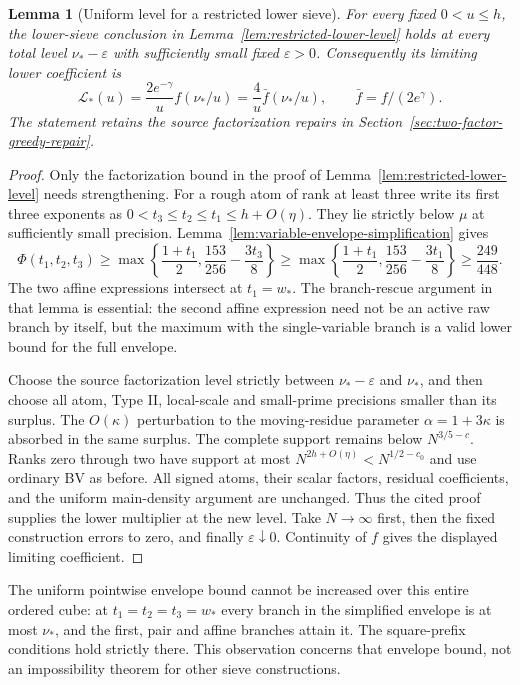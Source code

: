 \documentclass[11pt]{article}
\newtheorem{lemma}[theorem]{Lemma}
\begin{document}
\begin{lemma}[Uniform level for a restricted lower sieve]
\label{lem:restricted-lower-sharp-level}
For every fixed $0<u\le h$, the lower-sieve conclusion in
Lemma~\ref{lem:restricted-lower-level} holds at every total
level $\nu_* -\varepsilon$ with sufficiently small fixed $\varepsilon>0$.
Consequently its limiting lower coefficient is
\[
 \mathcal L_*(u)=\frac{2e^{-\gamma}}u f(\nu_*/u)
               =\frac4u\bar f(\nu_*/u),
 \qquad \bar f=f/(2e^\gamma).
\]
The statement retains the source factorization repairs in
Section~\ref{sec:two-factor-greedy-repair}.
\end{lemma}

\begin{proof}
Only the factorization bound in the proof of
Lemma~\ref{lem:restricted-lower-level} needs strengthening.
For a rough atom of rank at least three write its first
three exponents as $0<t_3\le t_2\le t_1\le h+O(\eta)$.
They lie strictly below $\mu$ at sufficiently small precision.
Lemma~\ref{lem:variable-envelope-simplification} gives
\[
 \Phi(t_1,t_2,t_3)
 \ge\max\left\{\frac{1+t_1}{2},
                      \frac{153}{256}-\frac{3t_3}{8}\right\}
 \ge\max\left\{\frac{1+t_1}{2},
                      \frac{153}{256}-\frac{3t_1}{8}\right\}
 \ge\frac{249}{448}.
\]
The two affine expressions intersect at $t_1=w_*$.
The branch-rescue argument in that lemma is essential: the
second affine expression need not be an active raw branch
by itself, but the maximum with the single-variable branch
is a valid lower bound for the full envelope.

Choose the source factorization level strictly between
$\nu_* -\varepsilon$ and $\nu_*$, and then choose all atom,
Type II, local-scale and small-prime precisions smaller than
its surplus. The $O(\kappa)$ perturbation to the moving-residue
parameter $\alpha=1+3\kappa$ is absorbed in the same surplus.
The complete support remains below $N^{3/5-c}$.
Ranks zero through two have support at most
$N^{2h+O(\eta)}<N^{1/2-c_0}$ and use ordinary BV as before.
All signed atoms, their scalar factors, residual coefficients,
and the uniform main-density argument are unchanged.
Thus the cited proof supplies the lower multiplier at the new
level. Take $N\to\infty$ first, then the fixed construction
errors to zero, and finally $\varepsilon\downarrow0$.
Continuity of $f$ gives the displayed limiting coefficient.
\end{proof}

The uniform pointwise envelope bound cannot be increased over
this entire ordered cube: at
$t_1=t_2=t_3=w_*$ every branch in the simplified envelope is
at most $\nu_*$, and the first, pair and affine branches attain
it. The square-prefix conditions hold strictly there. This
observation concerns that envelope bound, not an impossibility
theorem for other sieve constructions.
\end{document}
